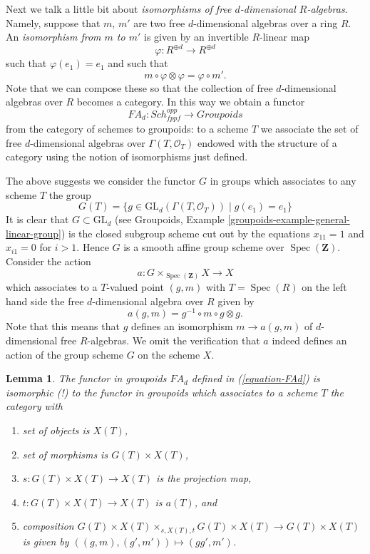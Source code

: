 \documentclass{stacks-project}
\theoremstyle{plain}
\newtheorem{lemma}[subsection]{Lemma}
\theoremstyle{definition}
\theoremstyle{remark}
\numberwithin{equation}{subsection}
\def\Spec{\mathop{\mathrm{Spec}}}
\def\Sch{\mathit{Sch}}
\begin{document}
\medskip\noindent
Next we talk a little bit about {\it isomorphisms of free $d$-dimensional
$R$-algebras}. Namely, suppose that $m$, $m'$ are two free $d$-dimensional
algebras over a ring $R$. An {\it isomorphism from $m$ to $m'$} is given by
an invertible $R$-linear map
$$
\varphi : R^{\oplus d} \longrightarrow R^{\oplus d}
$$
such that $\varphi(e_1) = e_1$ and such that
$$
m \circ \varphi \otimes \varphi = \varphi \circ m'.
$$
Note that we can compose these so that the collection of
free $d$-dimensional algebras over $R$ becomes a category.
In this way we obtain a functor
\begin{equation}
\label{equation-FAd}
FA_d : \Sch_{fppf}^{opp} \longrightarrow \textit{Groupoids}
\end{equation}
from the category of schemes to groupoids: to a scheme $T$ we associate the
set of free $d$-dimensional algebras over $\Gamma(T, \mathcal{O}_T)$
endowed with the structure
of a category using the notion of isomorphisms just defined.

\medskip\noindent
The above suggests we consider the functor $G$ in groups
which associates to any scheme $T$ the group
$$
G(T) = \{g \in \text{GL}_d(\Gamma(T, \mathcal{O}_T)) \mid g(e_1) = e_1\}
$$
It is clear that $G \subset \text{GL}_d$ (see
Groupoids, Example \ref{groupoids-example-general-linear-group})
is the closed subgroup scheme cut out by the equations
$x_{11} = 1$ and $x_{i1} = 0$ for $i > 1$. Hence $G$ is a smooth
affine group scheme over $\Spec(\mathbf{Z})$. Consider the
action
$$
a : G \times_{\Spec(\mathbf{Z})} X \longrightarrow X
$$
which associates to a $T$-valued point $(g, m)$ with $T = \Spec(R)$
on the left hand side the free $d$-dimensional algebra over $R$
given by
$$
a(g, m) = g^{-1} \circ m \circ g \otimes g.
$$
Note that this means that $g$ defines an isomorphism $m \to a(g, m)$
of $d$-dimensional free $R$-algebras. We omit the verification that
$a$ indeed defines an action of the group scheme $G$ on the scheme $X$.

\begin{lemma}
\label{lemma-represent-FAd}
The functor in groupoids $FA_d$ defined in (\ref{equation-FAd})
is isomorphic (!) to the functor in groupoids which associates
to a scheme $T$ the category with
\begin{enumerate}
\item set of objects is $X(T)$,
\item set of morphisms is $G(T) \times X(T)$,
\item $s : G(T) \times X(T) \to X(T)$ is the projection map,
\item $t : G(T) \times X(T) \to X(T)$ is $a(T)$, and
\item composition $G(T) \times X(T) \times_{s, X(T), t} G(T) \times X(T)
\to G(T) \times X(T)$ is given by $((g, m), (g', m')) \mapsto (gg', m')$.
\end{enumerate}
\end{lemma}
\end{document}

